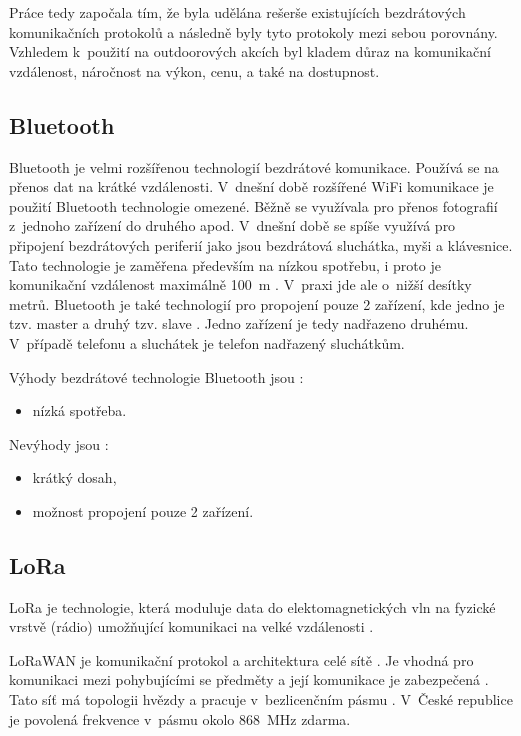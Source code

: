 Práce tedy započala tím, že byla udělána rešerše existujících bezdrátových komunikačních protokolů a následně byly tyto protokoly 
mezi sebou porovnány. Vzhledem k~použití na outdoorových akcích byl kladem důraz na komunikační vzdálenost, náročnost na výkon, cenu, 
a také na dostupnost. 

\subsection{Bluetooth}
Bluetooth je velmi rozšířenou technologií bezdrátové komunikace. Používá se na přenos dat na krátké vzdálenosti. V~dnešní době 
rozšířené WiFi komunikace je použití Bluetooth technologie omezené. Běžně se využívala pro přenos fotografií z~jednoho zařízení do druhého apod. V~dnešní 
době se spíše využívá pro připojení bezdrátových periferií jako jsou bezdrátová sluchátka, myši a klávesnice. Tato technologie je zaměřena 
především na nízkou spotřebu, i proto je komunikační vzdálenost maximálně 100~m \cite{Bezdrat_muni}. V~praxi jde ale o~nižší desítky
metrů. Bluetooth je také technologií pro propojení pouze 2 zařízení, kde jedno je tzv. master a druhý tzv. slave \cite{Bezdrat_muni}. 
Jedno zařízení je tedy nadřazeno druhému. V~případě telefonu a sluchátek je telefon nadřazený sluchátkům. 

Výhody bezdrátové technologie Bluetooth jsou \cite{Bezdrat_muni}:
\begin{itemize}
  \item nízká spotřeba.
\end{itemize}

Nevýhody jsou \cite{Bezdrat_muni}:
\begin{itemize}
  \item krátký dosah,
  \item možnost propojení pouze 2 zařízení.
\end{itemize}

\subsection{LoRa}
LoRa je technologie, která moduluje data do elektomagnetických vln na fyzické vrstvě (rádio) umožňující komunikaci na velké vzdálenosti \cite{LoRa_eman}. 

LoRaWAN je komunikační protokol a architektura celé sítě \cite{LoRa_eman}. Je vhodná pro komunikaci mezi pohybujícími se předměty a její komunikace je 
zabezpečená \cite{LoRa_eman}. Tato síť má topologii hvězdy a pracuje v~bezlicenčním pásmu \cite{LoRa_eman}. V~České republice je povolená frekvence v~pásmu 
okolo 868~MHz zdarma.

